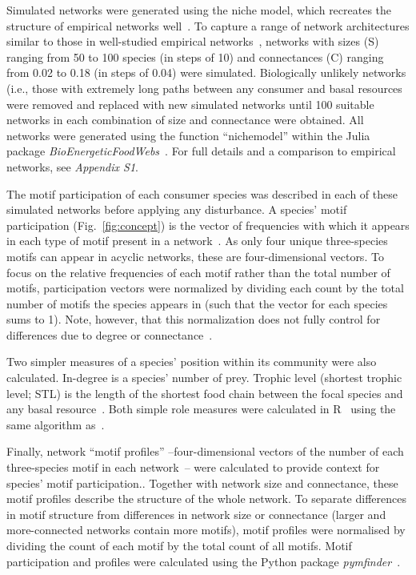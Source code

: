 \documentclass[12pt]{article}
\begin{document}
\begin{spacing}{2.0}
        Simulated networks were generated using the niche model, which recreates the structure of empirical networks well~\citep{Williams2000,Stouffer2007}.
        To capture a range of network architectures similar to those in well-studied empirical networks~\citep{Dunne2002,Dunne2002e}, networks with sizes (S) ranging from 50 to 100 species (in steps of 10) and connectances (C) ranging from 0.02 to 0.18 (in steps of 0.04) were simulated. 
        Biologically unlikely networks (i.e., those with extremely long paths between any consumer and basal resources~\citep{Borrelli2014} were removed and replaced with new simulated networks until 100 suitable networks in each combination of size and connectance were obtained.
        All networks were generated using the function ``nichemodel'' within the Julia~\citep{Bezanson2017julia} package \emph{BioEnergeticFoodWebs}~\citep{bioenergfw,Delmas2017}.     
        For full details and a comparison to empirical networks, see \emph{Appendix S1}.

        
        The motif participation of each consumer species was described in each of these simulated networks before applying any disturbance. 
        A species' motif participation (Fig.~\ref{fig:concept}) is the vector of frequencies with which it appears in each type of motif present in a network~\citep{Stouffer2012}.
        As only four unique three-species motifs can appear in acyclic networks, these are four-dimensional vectors. 
        To focus on the relative frequencies of each motif rather than the total number of motifs, participation vectors were normalized by dividing each count by the total number of motifs the species appears in (such that the vector for each species sums to 1).
        Note, however, that this normalization does not fully control for differences due to degree or connectance~\citep{Cirtwill2022Oikos}. 


        Two simpler measures of a species' position within its community were also calculated.
        In-degree is a species' number of prey.
        Trophic level (shortest trophic level; STL) is the length of the shortest food chain between the focal species and any basal resource~\citep{Williams2004}.
        Both simple role measures were calculated in R~\citep{R} using the same algorithm as~\citet{Eklof2013}.

        
        Finally, network ``motif profiles'' --four-dimensional vectors of the number of each three-species motif in each network~\citep{Stouffer2012}-- were calculated to provide context for species' motif participation..
        Together with network size and connectance, these motif profiles describe the structure of the whole network.
        To separate differences in motif structure from differences in network size or connectance (larger and more-connected networks contain more motifs), motif profiles were normalised by dividing the count of each motif by the total count of all motifs. 
        Motif participation and profiles were calculated using the Python package \emph{pymfinder}~\citep{pymfinder}.


\end{spacing}
\end{document}
